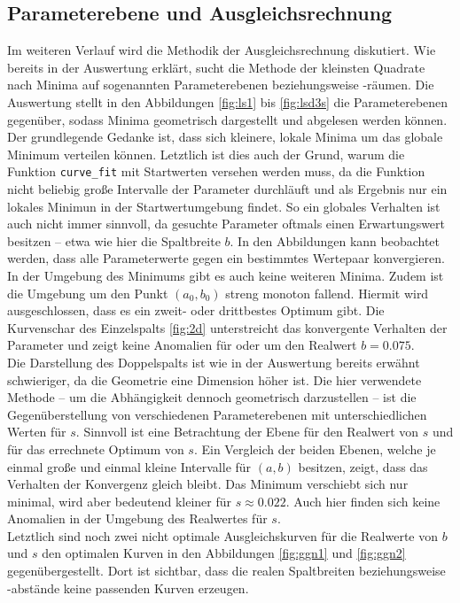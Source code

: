 \subsection{Parameterebene und Ausgleichsrechnung}
Im weiteren Verlauf wird die Methodik der Ausgleichsrechnung diskutiert.
Wie bereits in der Auswertung erklärt, sucht die Methode der kleinsten Quadrate nach Minima auf sogenannten Parameterebenen beziehungsweise -räumen.
Die Auswertung stellt in den Abbildungen \ref{fig:ls1} bis \ref{fig:lsd3s} die Parameterebenen gegenüber, sodass Minima geometrisch dargestellt und abgelesen werden können.
Der grundlegende Gedanke ist, dass sich kleinere, lokale Minima um das globale Minimum verteilen können.
Letztlich ist dies auch der Grund, warum die Funktion \texttt{curve\_fit} mit Startwerten versehen werden muss, da die Funktion nicht beliebig große Intervalle der Parameter durchläuft und als Ergebnis nur ein lokales Minimun in der Startwertumgebung findet.
So ein globales Verhalten ist auch nicht immer sinnvoll, da gesuchte Parameter oftmals einen Erwartungswert besitzen -- etwa wie hier die Spaltbreite $b$.
In den Abbildungen kann beobachtet werden, dass alle Parameterwerte gegen ein bestimmtes Wertepaar konvergieren. In der Umgebung des Minimums gibt es auch keine weiteren Minima. Zudem ist die Umgebung um den Punkt $(a_0, b_0)$ streng monoton fallend.
Hiermit wird ausgeschlossen, dass es ein zweit- oder drittbestes Optimum gibt.
Die Kurvenschar des Einzelspalts \ref{fig:2d} unterstreicht das konvergente Verhalten der Parameter und zeigt keine Anomalien für oder um den Realwert $b = 0.075$.\\

Die Darstellung des Doppelspalts ist wie in der Auswertung bereits erwähnt schwieriger, da die Geometrie eine Dimension höher ist.
Die hier verwendete Methode -- um die Abhängigkeit dennoch geometrisch darzustellen -- ist die Gegenüberstellung von verschiedenen Parameterebenen mit unterschiedlichen Werten für $s$.
Sinnvoll ist eine Betrachtung der Ebene für den Realwert von $s$ und für das errechnete Optimum von $s$.
Ein Vergleich der beiden Ebenen, welche je einmal große und einmal kleine Intervalle für $(a, b)$ besitzen, zeigt, dass das Verhalten der Konvergenz gleich bleibt. Das Minimum verschiebt sich nur minimal, wird aber bedeutend kleiner für $s \approx 0.022$. Auch hier finden sich keine Anomalien in der Umgebung des Realwertes für $s$.\\

Letztlich sind noch zwei nicht optimale Ausgleichskurven für die Realwerte von $b$ und $s$ den optimalen Kurven in den Abbildungen \ref{fig:ggn1} und \ref{fig:ggn2} gegenübergestellt.
Dort ist sichtbar, dass die realen Spaltbreiten beziehungsweise -abstände keine passenden Kurven erzeugen. \\

